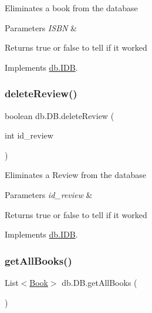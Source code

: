 Eliminates a book from the database 
\begin{DoxyParams}{Parameters}
{\em I\+S\+BN} & \\
\hline
\end{DoxyParams}
\begin{DoxyReturn}{Returns}
true or false to tell if it worked 
\end{DoxyReturn}


Implements \hyperlink{interfacedb_1_1_i_d_b_a8fa065455c75f33b9713b8d5058a0e30}{db.\+I\+DB}.

\mbox{\label{classdb_1_1_d_b_ab3664756678e77a9f1b9c6c93c81d691}} 
\subsubsection{\texorpdfstring{delete\+Review()}{deleteReview()}}
{\footnotesize\ttfamily boolean db.\+D\+B.\+delete\+Review (\begin{DoxyParamCaption}\item[{int}]{id\+\_\+review }\end{DoxyParamCaption})}

Eliminates a Review from the database 
\begin{DoxyParams}{Parameters}
{\em id\+\_\+review} & \\
\hline
\end{DoxyParams}
\begin{DoxyReturn}{Returns}
true or false to tell if it worked 
\end{DoxyReturn}


Implements \hyperlink{interfacedb_1_1_i_d_b_a37810242fa48895f21f790ef6a367225}{db.\+I\+DB}.

\mbox{\label{classdb_1_1_d_b_ab4fbfd3716967ce37cc462ca04c68ca8}} 
\subsubsection{\texorpdfstring{get\+All\+Books()}{getAllBooks()}}
{\footnotesize\ttfamily List$<$\hyperlink{classserver_1_1data_1_1_book}{Book}$>$ db.\+D\+B.\+get\+All\+Books (\begin{DoxyParamCaption}{ }\end{DoxyParamCaption})}

